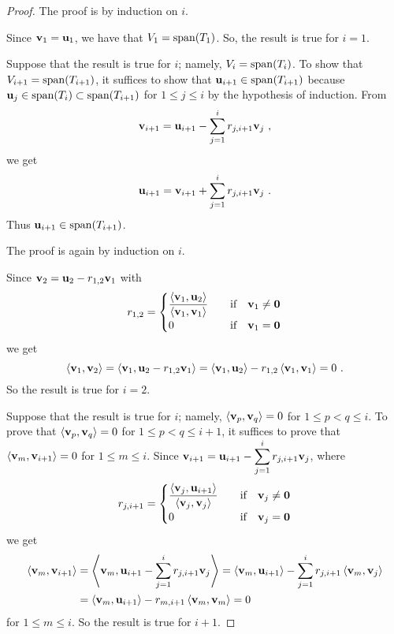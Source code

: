 \begin{proof}
 The proof is by induction on $i$.

Since $\mathbf{v}_1 = \mathbf{u}_1$, we have that $V_1 = \operatorname{span}(T_1)$.  So,
the result is true for $i=1$.

Suppose that the result is true for $i$; namely, $V_i = \operatorname{span}(T_i)$.
To show that $V_{i+1} = \operatorname{span}(T_{i+1})$, it suffices to show that
$\mathbf{u}_{i+1} \in \operatorname{span}(T_{i+1})$ because
$\mathbf{u}_j \in \operatorname{span}(T_i) \subset \operatorname{span}(T_{i+1})$ for $1 \leq j \leq i$
by the hypothesis of induction.  From
\[
\mathbf{v}_{i+1} = \mathbf{u}_{i+1} - \sum_{j=1}^i r_{j,i+1} \mathbf{v}_j \ ,
\]
we get
\[
\mathbf{u}_{i+1} = \mathbf{v}_{i+1} + \sum_{j=1}^i r_{j,i+1} \mathbf{v}_j \ .
\]
Thus $\mathbf{u}_{i+1} \in \operatorname{span}(T_{i+1})$.

 The proof is again by induction on $i$.

Since $\mathbf{v}_2 = \mathbf{u}_2 - r_{1,2} \mathbf{v}_1$ with
\[
r_{1,2} = \begin{cases}
\displaystyle \frac{\left\langle{\mathbf{v}_1} , {\mathbf{u}_2}\right\rangle}{\left\langle{\mathbf{v}_1} , {\mathbf{v}_1}\right\rangle}
& \quad \text{if} \quad \mathbf{v}_1 \neq \mathbf{0} \\
0 & \quad \text{if} \quad \mathbf{v}_1 = \mathbf{0}
\end{cases}
\]
we get
\[
\left\langle{\mathbf{v}_1} , {\mathbf{v}_2}\right\rangle
= \left\langle{\mathbf{v}_1} , {\mathbf{u}_2 - r_{1,2} \mathbf{v}_1}\right\rangle
= \left\langle{\mathbf{v}_1} , {\mathbf{u}_2}\right\rangle - r_{1,2} \left\langle{\mathbf{v}_1} , {\mathbf{v}_1}\right\rangle
= 0 \ .
\]
So the result is true for $i=2$.

Suppose that the result is true for $i$; namely,
$\left\langle{\mathbf{v}_p} , {\mathbf{v}_q}\right\rangle = 0$ for $1 \leq p < q \leq i$.  To prove
that $\left\langle{\mathbf{v}_p} , {\mathbf{v}_q}\right\rangle = 0$ for $1 \leq p < q \leq i+1$, it
suffices to prove that
$\left\langle{\mathbf{v}_m} , {\mathbf{v}_{i+1}}\right\rangle = 0$ for $1 \leq m \leq i$.
Since
$\displaystyle \mathbf{v}_{i+1} = \mathbf{u}_{i+1} - \sum_{j=1}^ir_{j,i+1}\mathbf{v}_j$,
where
\[
r_{j,i+1} = \begin{cases}
\displaystyle \frac{\left\langle{\mathbf{v}_j} , {\mathbf{u}_{i+1}}\right\rangle}{\left\langle{\mathbf{v}_j} , {\mathbf{v}_j}\right\rangle}
& \quad \text{if} \quad \mathbf{v}_j \neq \mathbf{0} \\
0 & \quad \text{if} \quad \mathbf{v}_j = \mathbf{0}
\end{cases}
\]
we get
\begin{align*}
\left\langle{\mathbf{v}_m} , {\mathbf{v}_{i+1}}\right\rangle
&= \left\langle{\mathbf{v}_m} , {\mathbf{u}_{i+1} - \sum_{j=1}^ir_{j,i+1}\mathbf{v}_j}\right\rangle
= \left\langle{\mathbf{v}_m} , {\mathbf{u}_{i+1}}\right\rangle -
\sum_{j=1}^ir_{j,i+1}\left\langle{\mathbf{v}_m} , {\mathbf{v}_j}\right\rangle \\
&= \left\langle{\mathbf{v}_m} , {\mathbf{u}_{i+1}}\right\rangle - r_{m,i+1}\left\langle{\mathbf{v}_m} , {\mathbf{v}_m}\right\rangle
= 0
\end{align*}
for $1 \leq m \leq i$.   So the result is true for $i+1$.


\end{proof}
